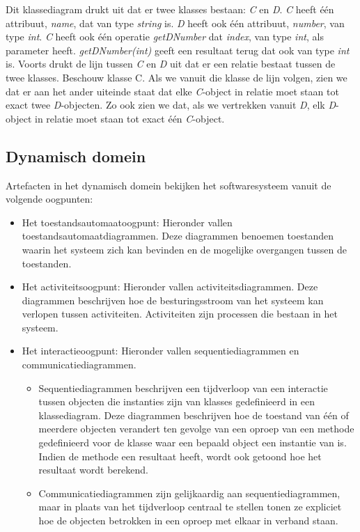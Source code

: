 Dit klassediagram drukt uit dat er twee klasses bestaan: \textit{C} en \textit{D}. \textit{C} heeft \'e\'en attribuut, \textit{name}, dat van type \textit{string} is. \textit{D} heeft ook \'e\'en attribuut, \textit{number}, van type \textit{int}. \textit{C} heeft ook \'e\'en operatie \textit{getDNumber} dat \textit{index}, van type \textit{int}, als parameter heeft. \textit{getDNumber(int)} geeft een resultaat terug dat ook van type \textit{int} is. Voorts drukt de lijn tussen \textit{C} en \textit{D} uit dat er een relatie bestaat tussen de twee klasses. Beschouw klasse C. Als we vanuit die klasse de lijn volgen, zien we dat er aan het ander uiteinde staat dat elke \textit{C}-object in relatie moet staan tot exact twee \textit{D}-objecten. Zo ook zien we dat, als we vertrekken vanuit \textit{D}, elk \textit{D}-object in relatie moet staan tot exact \'e\'en \textit{C}-object.

\subsection{Dynamisch domein}

Artefacten in het dynamisch domein bekijken het softwaresysteem vanuit de volgende oogpunten:

\begin{itemize}
	\item Het toestandsautomaatoogpunt: Hieronder vallen toestandsautomaatdiagrammen. Deze diagrammen benoemen toestanden waarin het systeem zich kan bevinden en de mogelijke overgangen tussen de toestanden.
	\item Het activiteitsoogpunt: Hieronder vallen activiteitsdiagrammen. Deze diagrammen beschrijven hoe de besturingsstroom van het systeem kan verlopen tussen activiteiten. Activiteiten zijn processen die bestaan in het systeem.
	\item Het interactieoogpunt: Hieronder vallen sequentiediagrammen en communicatiediagrammen.
	\begin{itemize}
		\item Sequentiediagrammen beschrijven een tijdverloop van een interactie tussen objecten die instanties zijn van klasses gedefinieerd in een klassediagram. Deze diagrammen beschrijven hoe de toestand van \'e\'en of meerdere objecten verandert ten gevolge van een oproep van een methode gedefinieerd voor de klasse waar een bepaald object een instantie van is. Indien de methode een resultaat heeft, wordt ook getoond hoe het resultaat wordt berekend.
		\item Communicatiediagrammen zijn gelijkaardig aan sequentiediagrammen, maar in plaats van het tijdverloop centraal te stellen tonen ze expliciet hoe de objecten betrokken in een oproep met elkaar in verband staan. 
	\end{itemize}
\end{itemize}

